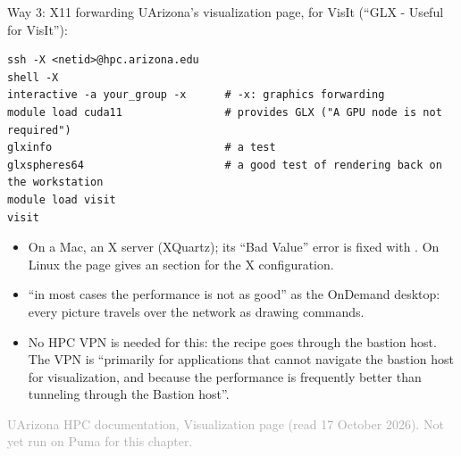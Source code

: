 \documentclass[aspectratio=169,11pt]{beamer}
\newcommand{\sourcecredit}[1]{\vfill\begin{flushright}\tiny\textcolor{DarkGray}{#1}\end{flushright}}
\begin{document}
\begin{frame}[fragile]{Way 3: X11 forwarding}
\label{fr:x11}
\footnotesize
UArizona's visualization page, for VisIt (``GLX - Useful for VisIt''):
\begin{lstlisting}[style=shell]
ssh -X <netid>@hpc.arizona.edu
shell -X
interactive -a your_group -x      # -x: graphics forwarding
module load cuda11                # provides GLX ("A GPU node is not required")
glxinfo                           # a test
glxspheres64                      # a good test of rendering back on the workstation
module load visit
visit
\end{lstlisting}
\begin{itemize}\setlength{\itemsep}{1pt}
  \item On a Mac, an X server (XQuartz); its ``Bad Value'' error is fixed with . On Linux the page gives an  section for the X configuration.
  \item ``in most cases the performance is not as good'' as the OnDemand desktop: every picture travels over the network as drawing commands.
  \item No HPC VPN is needed for this: the recipe goes through the bastion host. The VPN is ``primarily for applications that cannot navigate the bastion host for visualization, and because the performance is frequently better than tunneling through the Bastion host''.
\end{itemize}
\sourcecredit{UArizona HPC documentation, Visualization page (read 17 October 2026). Not yet run on Puma for this chapter.}
\end{frame}
\end{document}
